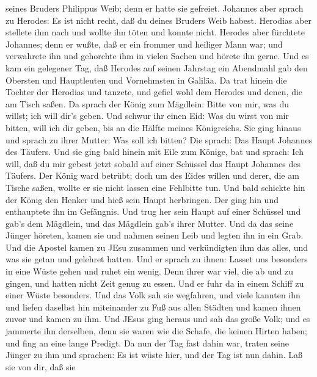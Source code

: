 seines Bruders Philippus Weib; denn er hatte sie gefreiet. 
Johannes aber sprach zu Herodes: Es ist nicht recht, daß du deines
Bruders Weib habest.  Herodias aber stellete ihm nach und
wollte ihn töten und konnte nicht.  Herodes aber fürchtete
Johannes; denn er wußte, daß er ein frommer und heiliger Mann war; und
verwahrete ihn und gehorchte ihm in vielen Sachen und hörete ihn gerne.
 Und es kam ein gelegener Tag, daß Herodes auf seinen
Jahrstag ein Abendmahl gab den Obersten und Hauptleuten und Vornehmsten
in Galiläa.  Da trat hinein die Tochter der Herodias und
tanzete, und gefiel wohl dem Herodes und denen, die am Tisch saßen. Da
sprach der König zum Mägdlein: Bitte von mir, was du willst; ich will
dir's geben.  Und schwur ihr einen Eid: Was du wirst von
mir bitten, will ich dir geben, bis an die Hälfte meines Königreichs.
 Sie ging hinaus und sprach zu ihrer Mutter: Was soll ich
bitten? Die sprach: Das Haupt Johannes des Täufers.  Und
sie ging bald hinein mit Eile zum Könige, bat und sprach: Ich will, daß
du mir gebest jetzt sobald auf einer Schüssel das Haupt Johannes des
Täufers.  Der König ward betrübt; doch um des Eides willen
und derer, die am Tische saßen, wollte er sie nicht lassen eine
Fehlbitte tun.  Und bald schickte hin der König den Henker
und hieß sein Haupt herbringen. Der ging hin und enthauptete ihn im
Gefängnis.  Und trug her sein Haupt auf einer Schüssel und
gab's dem Mägdlein, und das Mägdlein gab's ihrer Mutter. 
Und da das seine Jünger höreten, kamen sie und nahmen seinen Leib und
legten ihn in ein Grab.  Und die Apostel kamen zu JEsu
zusammen und verkündigten ihm das alles, und was sie getan und gelehret
hatten.  Und er sprach zu ihnen: Lasset uns besonders in
eine Wüste gehen und ruhet ein wenig. Denn ihrer war viel, die ab und zu
gingen, und hatten nicht Zeit genug zu essen.  Und er fuhr
da in einem Schiff zu einer Wüste besonders.  Und das Volk
sah sie wegfahren, und viele kannten ihn und liefen daselbst hin
miteinander zu Fuß aus allen Städten und kamen ihnen zuvor und kamen zu
ihm.  Und JEsus ging heraus und sah das große Volk; und es
jammerte ihn derselben, denn sie waren wie die Schafe, die keinen Hirten
haben; und fing an eine lange Predigt.  Da nun der Tag fast
dahin war, traten seine Jünger zu ihm und sprachen: Es ist wüste hier,
und der Tag ist nun dahin.  Laß sie von dir, daß sie
